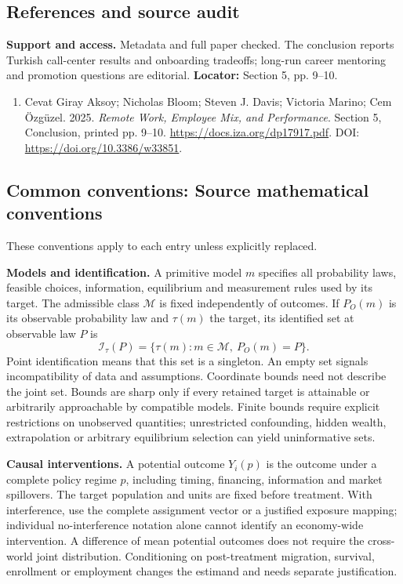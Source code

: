 \documentclass[11pt,a4paper]{article}
\begin{document}
\subsection*{References and source audit}
\textbf{Support and access.} Metadata and full paper checked. The conclusion reports Turkish call-center results and onboarding tradeoffs; long-run career mentoring and promotion questions are editorial. \textbf{Locator:} Section 5, pp. 9--10.
\begin{enumerate}\raggedright
\item\hypertarget{definitions:source:30007640:1}{} Cevat Giray Aksoy; Nicholas Bloom; Steven J. Davis; Victoria Marino; Cem \"{O}zg\"{u}zel. 2025. \emph{Remote Work, Employee Mix, and Performance}. Section 5, Conclusion, printed pp. 9–10.
\url{https://docs.iza.org/dp17917.pdf}.
DOI: \url{https://doi.org/10.3386/w33851}.
\end{enumerate}

\subsection*{Common conventions: Source mathematical conventions}

These conventions apply to each entry unless explicitly replaced.

\textbf{Models and identification.} A primitive model \(m\) specifies all probability laws, feasible choices, information, equilibrium and measurement rules used by its target. The admissible class \(\mathcal M\) is fixed independently of outcomes. If \(P_O(m)\) is its observable probability law and \(\tau(m)\) the target, its identified set at observable law \(P\) is
\[
 \mathcal I_\tau(P)=\{\tau(m):m\in\mathcal M,\ P_O(m)=P\}.
\]
Point identification means that this set is a singleton. An empty set signals incompatibility of data and assumptions. Coordinate bounds need not describe the joint set. Bounds are sharp only if every retained target is attainable or arbitrarily approachable by compatible models. Finite bounds require explicit restrictions on unobserved quantities; unrestricted confounding, hidden wealth, extrapolation or arbitrary equilibrium selection can yield uninformative sets.

\textbf{Causal interventions.} A potential outcome \(Y_i(p)\) is the outcome under a complete policy regime \(p\), including timing, financing, information and market spillovers. The target population and units are fixed before treatment. With interference, use the complete assignment vector or a justified exposure mapping; individual no-interference notation alone cannot identify an economy-wide intervention. A difference of mean potential outcomes does not require the cross-world joint distribution. Conditioning on post-treatment migration, survival, enrollment or employment changes the estimand and needs separate justification.
\end{document}
